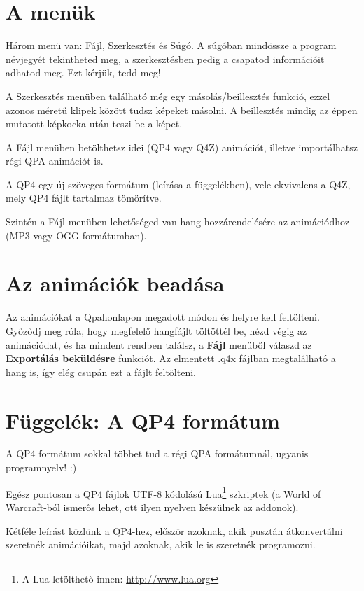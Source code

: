 \documentclass[a4paper,12pt,release]{article}
\begin{document}
\section{A menük}
Három menü van: Fájl, Szerkesztés és Súgó. A súgóban mindössze a program névjegyét tekintheted meg, a szerkesztésben pedig a csapatod információit adhatod meg. Ezt kérjük, tedd meg!

A Szerkesztés menüben található még egy másolás/beillesztés funkció, ezzel azonos méretű klipek között tudsz képeket másolni. A beillesztés mindig az éppen mutatott képkocka után teszi be a képet.

A Fájl menüben betölthetsz idei (QP4 vagy Q4Z) animációt, illetve importálhatsz régi QPA animációt is.

A QP4 egy új szöveges formátum (leírása a függelékben), vele ekvivalens a Q4Z, mely QP4 fájlt tartalmaz tömörítve.

Szintén a Fájl menüben lehetőséged van hang hozzárendelésére az animációdhoz (MP3 vagy OGG formátumban).
\section{Az animációk beadása}
Az animációkat a Qpahonlapon megadott módon és helyre kell feltölteni. Győződj meg róla, hogy megfelelő hangfájlt töltöttél be, nézd végig az animációdat, és ha mindent rendben találsz, a {\bf Fájl} menüből válaszd az {\bf Exportálás beküldésre} funkciót. Az elmentett .q4x fájlban megtalálható a hang is, így elég csupán ezt a fájlt feltölteni.
\clearpage
\section{Függelék: A QP4 formátum}
A QP4 formátum sokkal többet tud a régi QPA formátumnál, ugyanis programnyelv! :)

Egész pontosan a QP4 fájlok UTF-8 kódolású Lua\footnote{A Lua letölthető innen: \href{http://www.lua.org}{http://www.lua.org}} szkriptek (a \foreignlanguage{english}{World of Warcraft}-ból ismerős lehet, ott ilyen nyelven készülnek az addonok).

Kétféle leírást közlünk a QP4-hez, először azoknak, akik pusztán átkonvertálni szeretnék animációikat, majd azoknak, akik le is szeretnék programozni.
\end{document}
